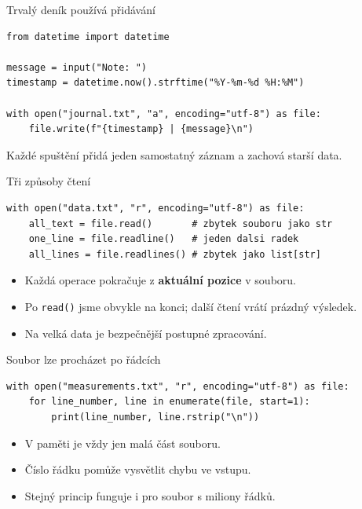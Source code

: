 \documentclass[aspectratio=169]{beamer}
\newcommand{\term}[1]{\textcolor{CodeBlue}{\textbf{#1}}}
\begin{document}
\begin{frame}[fragile]{Trvalý deník používá přidávání}
\begin{lstlisting}[style=pythonSmall]
from datetime import datetime

message = input("Note: ")
timestamp = datetime.now().strftime("%Y-%m-%d %H:%M")

with open("journal.txt", "a", encoding="utf-8") as file:
    file.write(f"{timestamp} | {message}\n")
\end{lstlisting}
  Každé spuštění přidá jeden samostatný záznam a zachová starší data.
\end{frame}

\begin{frame}[fragile]{Tři způsoby čtení}
\begin{lstlisting}[style=pythonSmall]
with open("data.txt", "r", encoding="utf-8") as file:
    all_text = file.read()       # zbytek souboru jako str
    one_line = file.readline()   # jeden dalsi radek
    all_lines = file.readlines() # zbytek jako list[str]
\end{lstlisting}
  \begin{itemize}
    \item Každá operace pokračuje z \term{aktuální pozice} v souboru.
    \item Po \texttt{read()} jsme obvykle na konci; další čtení vrátí prázdný výsledek.
    \item Na velká data je bezpečnější postupné zpracování.
  \end{itemize}
\end{frame}

\begin{frame}[fragile]{Soubor lze procházet po řádcích}
\begin{lstlisting}[style=python]
with open("measurements.txt", "r", encoding="utf-8") as file:
    for line_number, line in enumerate(file, start=1):
        print(line_number, line.rstrip("\n"))
\end{lstlisting}
  \begin{itemize}
    \item V paměti je vždy jen malá část souboru.
    \item Číslo řádku pomůže vysvětlit chybu ve vstupu.
    \item Stejný princip funguje i pro soubor s miliony řádků.
  \end{itemize}
\end{frame}
\end{document}
